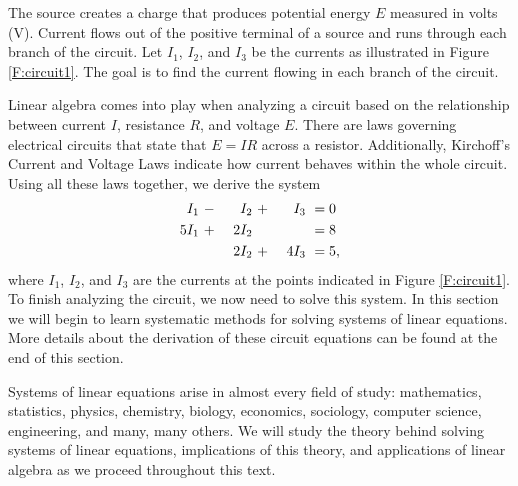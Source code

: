 The source creates a charge that produces potential energy $E$ measured in volts (V).  Current flows out of the positive terminal of a source and runs through each branch of the circuit. Let $I_1$, $I_2$, and $I_3$ be the currents as illustrated in  Figure \ref{F:circuit1}. The goal is to find the current flowing in each branch of the circuit.  

Linear algebra comes into play when analyzing a circuit based on the relationship between current $I$, resistance $R$, and voltage $E$. There are laws governing electrical circuits that state that $E = IR$ across a resistor. Additionally, Kirchoff's Current and Voltage Laws indicate how current behaves within the whole circuit. Using all these laws together, we derive the system
\begin{alignat}{4}
{}I_1 \	&- \	&{}I_2 \	&+ \	&{}I_3 \	&= 0  \notag \\ %
5I_1 \	&+ \	&2I_2 \		&{} \ 	&{}  \		&= 8 \notag \\ %
	\	&{} \ 	&2I_2 \		&+ \	&4I_3 \		&= 5, \notag %
\end{alignat}
where $I_1$, $I_2$, and $I_3$ are the currents at the points indicated in Figure \ref{F:circuit1}. To finish analyzing the circuit, we now need to solve this system. In this section we will begin to learn systematic methods for solving systems of linear equations. More details about the derivation of these circuit equations can be found at the end of this section.  


Systems of linear equations  arise in almost every field of study: mathematics, statistics, physics, chemistry, biology, economics, sociology, computer science, engineering, and many, many others. We will study the theory behind solving systems of linear equations, implications of this theory, and applications of linear algebra as we proceed throughout this text. 

